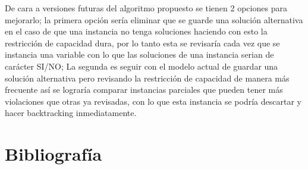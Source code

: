 \documentclass[letter, 10pt]{article}
\begin{document}
De cara a versiones futuras del algoritmo propuesto se tienen 2 opciones para mejorarlo; la primera opci\'on ser\'ia eliminar que se guarde una soluci\'on alternativa en el caso de que una instancia no tenga soluciones haciendo con esto la restricci\'on de capacidad dura, por lo tanto esta se revisar\'ia cada vez que se instancia una variable con lo que las soluciones de una instancia serian de car\'acter SI/NO; La segunda es seguir con el modelo actual de guardar una soluci\'on alternativa pero revisando la restricci\'on de capacidad de manera m\'as frecuente as\'i se lograr\'ia comparar instancias parciales que pueden tener m\'as violaciones que otras ya revisadas, con lo que esta instancia se podr\'ia descartar y hacer backtracking inmediatamente.
\section{Bibliograf\'ia}


\end{document}
